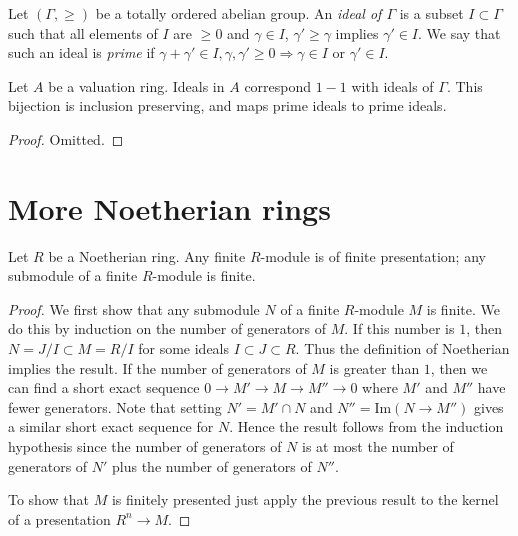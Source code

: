 \noindent
Let $(\Gamma, \geq)$ be a totally ordered abelian group.
An {\it ideal of $\Gamma$} is a subset $I \subset \Gamma$ such
that all elements of $I$ are $\geq 0$ and $\gamma \in I$,
$\gamma' \geq \gamma$ implies $\gamma' \in I$. We say that such
an ideal is {\it prime} if $\gamma + \gamma' \in I, \gamma, \gamma' \geq 0
\Rightarrow \gamma \in I \text{ or } \gamma' \in I$.

\begin{lemma}
\label{lemma-ideals-valuation-ring}
Let $A$ be a valuation ring.
Ideals in $A$ correspond $1 - 1$ with ideals of $\Gamma$.
This bijection is inclusion preserving, and maps prime
ideals to prime ideals.
\end{lemma}

\begin{proof}
Omitted.
\end{proof}

















\section{More Noetherian rings}
\label{section-Noetherian-again}


\begin{lemma}
\label{lemma-Noetherian-basic}
Let $R$ be a Noetherian ring.
Any finite $R$-module is of finite presentation; any submodule
of a finite $R$-module is finite.
\end{lemma}

\begin{proof}
We first show that any submodule $N$ of a finite $R$-module 
$M$ is finite. We do this by induction on the number of
generators of $M$. If this number is $1$, then $N = J/I \subset
M = R/I$ for some ideals $I \subset J \subset R$. Thus the definition
of Noetherian implies the result. If the number of generators of
$M$ is greater than $1$, then we can find a short exact sequence
$0 \to M' \to M \to M'' \to 0$ where $M'$ and $M''$ have fewer
generators. Note that setting $N' = M' \cap N$ and $N'' = \text{Im}(N\to
M'')$ gives a similar short exact sequence for $N$. Hence the result
follows from the induction hypothesis 
since the number of generators of $N$ is at most the number of
generators of $N'$ plus the number of generators of $N''$.

\medskip\noindent
To show that $M$ is finitely presented just apply the previous result
to the kernel of a presentation $R^n \to M$.
\end{proof}

